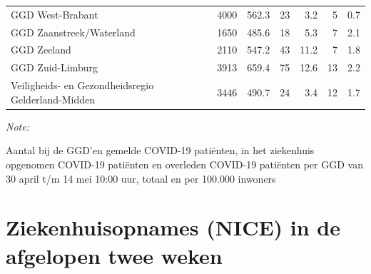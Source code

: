 \documentclass[
  english,
  man,floatsintext]{apa6}
\begin{document}
\begin{table}
\begin{threeparttable}
\begin{tabular}{lrrrrrr}
GGD West-Brabant & 4000 & 562.3 & 23 & 3.2 & 5 & 0.7\\
GGD Zaanstreek/Waterland & 1650 & 485.6 & 18 & 5.3 & 7 & 2.1\\
GGD Zeeland & 2110 & 547.2 & 43 & 11.2 & 7 & 1.8\\
GGD Zuid-Limburg & 3913 & 659.4 & 75 & 12.6 & 13 & 2.2\\
Veiligheids- en Gezondheidsregio Gelderland-Midden & 3446 & 490.7 & 24 & 3.4 & 12 & 1.7\\
\bottomrule
\end{tabular}
\begin{tablenotes}
\item \textit{Note: } 
\item Aantal bij de GGD’en gemelde COVID-19 patiënten, in het ziekenhuis opgenomen COVID-19 patiënten en overleden COVID-19 patiënten per GGD van 30 april t/m 14 mei 10:00 uur, totaal en per 100.000 inwoners
\end{tablenotes}
\end{threeparttable}
\endgroup{}
\end{table}

\newpage

\hypertarget{ziekenhuisopnames-nice-in-de-afgelopen-twee-weken}{%
\section{Ziekenhuisopnames (NICE) in de afgelopen twee weken}\label{ziekenhuisopnames-nice-in-de-afgelopen-twee-weken}}
\end{document}

